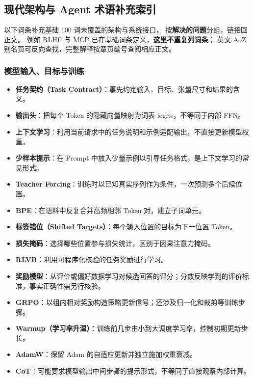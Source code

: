 \subsection{现代架构与 Agent 术语补充索引}
\label{intro:modern-lexicon}

以下词条补充基础 100 词未覆盖的架构与系统接口，
按\textbf{解决的问题}分组，链接回正文。
例如 RLHF 与 MCP 已在基础词条定义，\textbf{这里不重复列词条}；
英文 A--Z 别名页可反向查找，完整解释按章页编号查阅相应正文。

\subsubsection*{模型输入、目标与训练}
\begin{itemize}
\item \textbf{任务契约（Task Contract）}：事先约定输入、目标、张量尺寸和结果的含义。 
\item \textbf{输出头}：把每个 Token 的隐藏向量映射为词表 logits，不等同于内部 FFN。 
\item \textbf{上下文学习}：利用当前请求中的任务说明和示例适配输出，不直接更新模型权重。 
\item \textbf{少样本提示}：在 Prompt 中放入少量示例以引导任务格式，是上下文学习的常见形式。 
\item \textbf{Teacher Forcing}：训练时以已知真实序列作为条件，一次预测多个后续位置。 
\item \textbf{BPE}：在语料中反复合并高频相邻 Token 对，建立子词单元。 
\item \textbf{标签错位（Shifted Targets）}：每个输入位置的目标为下一位置 Token。 
\item \textbf{损失掩码}：选择哪些位置参与损失统计，区别于因果注意力掩码。 
\item \textbf{RLVR}：利用可程序化核验的任务奖励进行学习。 
\item \textbf{奖励模型}：从评价或偏好数据学习对候选回答的评分；分数反映学到的评价标准，事实正确性需另行核验。 
\item \textbf{GRPO}：以组内相对奖励构造策略更新信号；还涉及归一化和裁剪等训练步骤。 
\item \textbf{Warmup（学习率升温）}：训练前几步由小到大调度学习率，控制初期更新步长。 
\item \textbf{AdamW}：保留 Adam 的自适应更新并独立施加权重衰减。 
\item \textbf{CoT}：可能要求模型输出中间步骤的提示形式，不等同于直接观察内部计算。 
\end{itemize}

